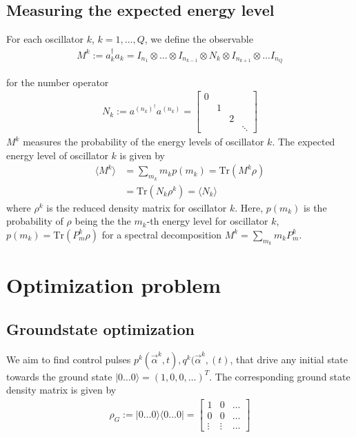 \documentclass[letterpaper]{article}
\begin{document}
\subsection{Measuring the expected energy level}\label{sec:expectedenergy}
For each oscillator $k$, $k=1,\dots, Q$, we define the observable 
\begin{align}
  M^k := a_k^\dag a_k  = I_{n_1} \otimes \dots \otimes I_{n_{k-1}} \otimes  N_k \otimes I_{n_{k+1}} \otimes \dots I_{n_Q} 
\end{align}
       
       \quad
for the number operator 
\begin{align}
  N_k := a^{(n_k)^\dag} a^{(n_k)} = \begin{bmatrix} 
   0 &    &    & \\
     &  1 &    &\\
     &    &  2 &\\
     &    &    & \ddots 
  \end{bmatrix}
\end{align}
$M^k$ measures the probability of the energy levels of oscillator $k$. The expected energy level of oscillator $k$ is given by 
\begin{align}
  \langle M^k \rangle &= \sum_{m_k} m_k p(m_k)  = \mbox{Tr}(M^k\rho) \\
   & = \mbox{Tr}(N_k \rho^k)  = \langle N_k\rangle
\end{align}
where $\rho^k$ is the reduced density matrix for oscillator $k$. Here, $p(m_k)$ is the probability of $\rho$ being the the $m_k$-th energy level for oscillator $k$, $p(m_k) = \mbox{Tr}(P^k_m \rho)$ for a spectral decomposition $M^k = \sum_{m_k} m_kP^k_m$. 


\section{Optimization problem}

\subsection{Groundstate optimization}
We aim to find control pulses $p^k(\vec{\alpha}^k, t), q^k(\vec{\alpha}^k, (t)$, that drive any initial state towards the ground state $|0\dots 0\rangle = (1, 0, 0, \dots )^T$. The corresponding ground state density matrix is given by
\begin{align}
      \rho_{G} := |0\dots 0\rangle \langle 0 \dots 0 | = \begin{bmatrix} 1      & 0      &  \dots   \\ 
                                         0      & 0      &  \dots  \\ 
                                         \vdots & \vdots &  \dots 
                    \end{bmatrix}
\end{align}
\end{document}
